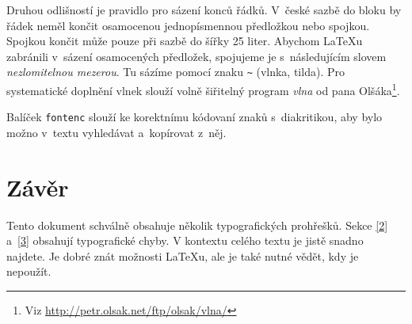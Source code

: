 \documentclass[a4paper, 10pt, twocolumn]{article}
\begin{document}
Druhou odlišností je pravidlo pro sázení konců řádků.
V~české sazbě do bloku by řádek neměl končit osamocenou jednopísmennou předložkou nebo spojkou.
Spojkou  končit může pouze při sazbě do šířky 25 liter.
Abychom \LaTeX u zabránili v~sázení osamocených předložek, spojujeme je s~následujícím slovem \emph{nezlomitelnou mezerou}.
Tu sázíme pomocí znaku \verb|~| (vlnka, tilda).
Pro systematické doplnění vlnek slouží volně šiřitelný program \emph{vlna} od pana Olšáka\footnote{Viz \url{http://petr.olsak.net/ftp/olsak/vlna/}}.

Balíček \texttt{fontenc} slouží ke korektnímu kódovaní znaků s~diakritikou, aby bylo možno v~textu vyhledávat a~kopírovat z~něj.

\section{Závěr}
Tento dokument schválně obsahuje několik typografických prohřešků.
Sekce \ref{2} a~\ref{3} obsahují typografické chyby.
V kontextu celého textu je jistě snadno najdete.
Je dobré znát možnosti \LaTeX u, ale je také nutné vědět, kdy je nepoužít.
\end{document}
